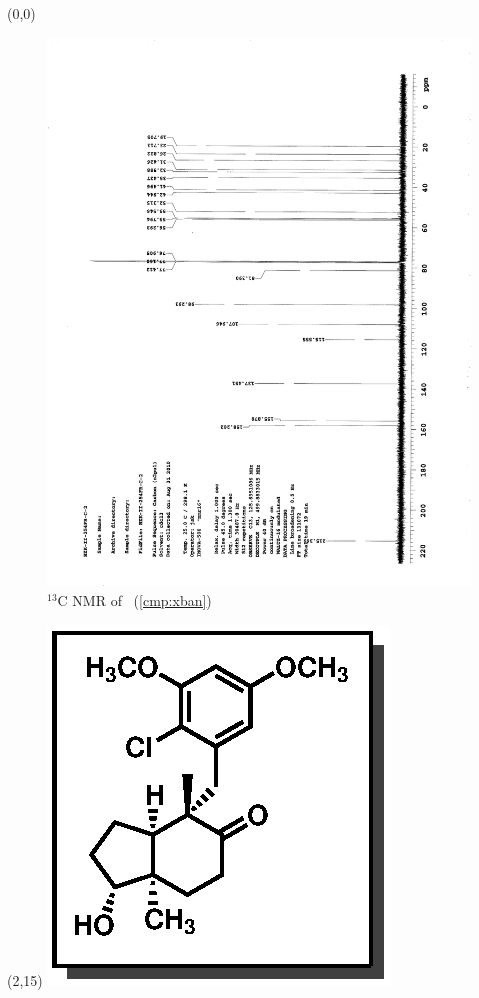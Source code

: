 \clearpage
\begin{textblock}{20}(0,0)
\begin{figure}[htb]
\caption{$^{13}$C NMR of  \CMPxban\ (\ref{cmp:xban})}
\includegraphics[scale=0.75, trim = 0mm 0mm 0mm 5mm,
clip]{chp_singlecarbon/images/nmr/xbanC}
\vspace{-100pt}
\end{figure}
\end{textblock}
\begin{textblock}{1}(2,15)
\includegraphics[scale=0.8, angle=90]{chp_singlecarbon/images/xban}
\end{textblock}
\clearpage

